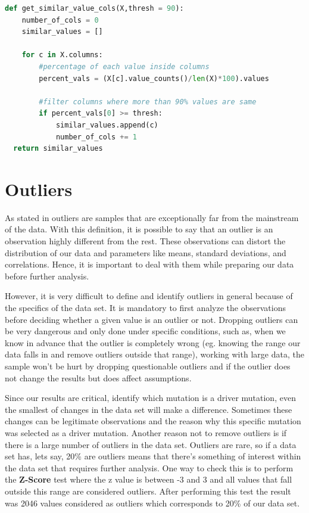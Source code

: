  
 
\begin{lstlisting}[language=Python]
def get_similar_value_cols(X,thresh = 90):
    number_of_cols = 0
    similar_values = []
       
    for c in X.columns:
        #percentage of each value inside columns
        percent_vals = (X[c].value_counts()/len(X)*100).values
        
        #filter columns where more than 90% values are same
        if percent_vals[0] >= thresh:
            similar_values.append(c)
            number_of_cols += 1 
  return similar_values
\end{lstlisting}

\section{Outliers} %
\label{sec:outliners}
\hspace{10px} As stated in \cite{Kuhn} outliers are samples that are exceptionally far from the mainstream of the data. With this definition, it is possible to say that an outlier is an observation highly different from the rest. These observations can distort the distribution of our data and parameters like means, standard deviations, and correlations. Hence, it is important to deal with them while preparing our data before further analysis.

However, it is very difficult to define and identify outliers in general because of the specifics of the data set. It is mandatory to first analyze the observations before deciding whether a given value is an outlier or not. Dropping outliers can be very dangerous and only done under specific conditions, such as, when we know in advance that the outlier is completely wrong (eg. knowing the range our data falls in and remove outliers outside that range), working with large data, the sample won’t be hurt by dropping questionable outliers and if the outlier does not change the results but does affect assumptions. 

Since our results are critical, identify which mutation is a driver mutation, even the smallest of changes in the data set will make a difference. Sometimes these changes can be legitimate observations and the reason why this specific mutation was selected as a driver mutation. Another reason not to remove outliers is if there is a large number of outliers in the data set. Outliers are rare, so if a data set has, lets say, 20\% are outliers means that there's something of interest within the data set that requires further analysis. One way to check this is to perform the \textbf{Z-Score} test where the z value is between -3 and 3 and all values that fall outside this range are considered outliers. After performing this test the result was 2046 values considered as outliers
which corresponds to 20\% of our data set. 

